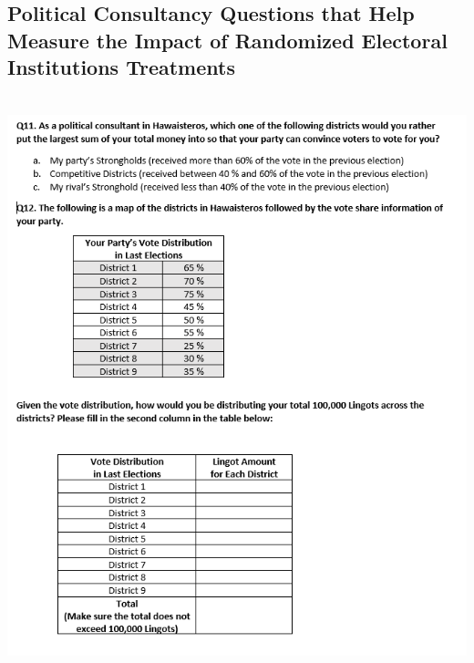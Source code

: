 \documentclass{article}
\begin{document}
\subsection{Political Consultancy Questions that Help Measure the Impact of Randomized Electoral Institutions Treatments}
\\
\includegraphics[width=140mm]{Survey_Question}
\\
\\
\\\\
\\
\\
\\
\end{document}
